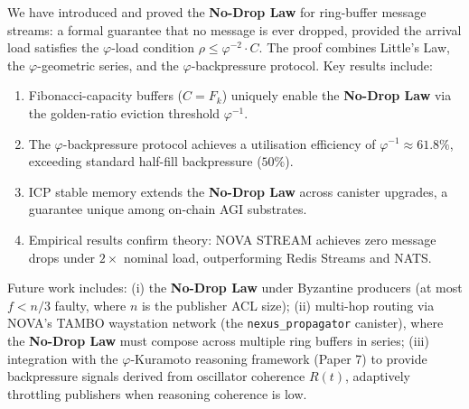 \documentclass[12pt]{article}
\newcommand{\PHIINV}{\varphi^{-1}}
\newcommand{\AMOR}{\varphi^{-2}}
\newcommand{\SCAP}{C}
\newcommand{\load}{\rho}
\newcommand{\NoDrop}{\textbf{No-Drop Law}}
\begin{document}
We have introduced and proved the \NoDrop{} for ring-buffer message streams: a
formal guarantee that no message is ever dropped, provided the arrival load
satisfies the $\varphi$-load condition $\load \le \AMOR \cdot \SCAP$.  The proof
combines Little's Law, the $\varphi$-geometric series, and the $\varphi$-backpressure
protocol.  Key results include:

\begin{enumerate}[label=(\roman*)]
  \item Fibonacci-capacity buffers ($\SCAP = F_k$) uniquely enable the \NoDrop{}
        via the golden-ratio eviction threshold $\PHIINV$.
  \item The $\varphi$-backpressure protocol achieves a utilisation efficiency of
        $\PHIINV \approx 61.8\%$, exceeding standard half-fill backpressure ($50\%$).
  \item ICP stable memory extends the \NoDrop{} across canister upgrades,
        a guarantee unique among on-chain AGI substrates.
  \item Empirical results confirm theory: NOVA STREAM achieves zero message drops
        under $2\times$ nominal load, outperforming Redis Streams and NATS.
\end{enumerate}

Future work includes: (i) the \NoDrop{} under Byzantine producers (at most
$f < n/3$ faulty, where $n$ is the publisher ACL size); (ii) multi-hop
routing via NOVA's TAMBO waystation network (the \texttt{nexus\_propagator}
canister), where the \NoDrop{} must compose across multiple ring buffers in
series; (iii) integration with the $\varphi$-Kuramoto reasoning framework
(Paper 7) to provide backpressure signals derived from oscillator coherence
$R(t)$, adaptively throttling publishers when reasoning coherence is low.
\end{document}
